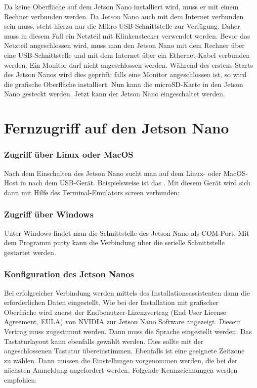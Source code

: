 Da keine Oberfläche auf dem Jetson Nano installiert wird, muss er mit einem Rechner verbunden werden. Da Jetson Nano auch mit dem Internet verbunden sein muss, steht hierzu nur die Mikro USB-Schnittstelle zur Verfügung. Daher muss in diesem Fall ein Netzteil mit Klinkenstecker verwendet werden. Bevor das Netzteil angeschlossen wird, muss man den Jetson Nano mit dem Rechner über eine USB-Schnittstelle und mit dem Internet über ein Ethernet-Kabel verbunden werden. Ein Monitor darf nicht angeschlossen werden. Während des erstens Starts des Jetson Nanos wird dies geprüft; falls eine Monitor angeschlossen ist, so wird die grafische Oberfläche installiert. Nun kann die microSD-Karte in den Jetson Nano gesteckt werden. Jetzt kann der Jetson Nano eingeschaltet werden.


\section{Fernzugriff auf den Jetson Nano}

\subsubsection{Zugriff über Linux oder MacOS}

Nach dem Einschalten des Jetson Nano sucht man auf dem Linux- oder MacOS-Host in  nach dem USB-Gerät. Beispielsweise ist das  . 
Mit diesem Gerät wird sich dann mit Hilfe des Terminal-Emulators \glqq screen\grqq{} verbunden:

\medskip


\subsubsection{Zugriff über Windows}

Unter Windows findet man die Schnittstelle des  Jetson Nano  als COM-Port. Mit dem Programm \glqq putty\grqq{} kann die Verbindung über die serielle Schnittstelle gestartet werden.

\subsubsection{Konfiguration des Jetson Nanos}

Bei erfolgreicher Verbindung werden mittels des Installationsassistenten  dann die erforderlichen Daten eingestellt. Wie bei der Installation mit grafischer Oberfläche wird zuerst der Endbenutzer-Lizenzvertrag (End User License Agreement, EULA) von NVIDIA zur Jetson Nano Software angezeigt. Diesem Vertrag muss zugestimmt werden. Dann muss die Sprache eingestellt werden. Das Tastaturlayout kann ebenfalls gewählt werden. Dies sollte mit der angeschlossenen Tastatur übereinstimmen. Ebenfalls ist eine geeignete Zeitzone zu wählen. Dann müssen die Einstellungen vorgenommen werden, die bei der nächsten Anmeldung angefordert werden. Folgende Kennzeichnungen werden empfohlen:

